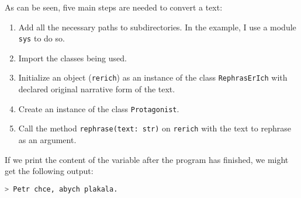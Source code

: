 As can be seen, five main steps are needed to convert a text:

\begin{enumerate}
	\item Add all the necessary paths to subdirectories. In the example, I use a module \texttt{sys} to do so.
	\item Import the classes being used.
	\item Initialize an object (\texttt{rerich}) as an instance of the class \texttt{RephrasErIch} with declared original narrative form of the text.
	\item Create an instance of the class \texttt{Protagonist}.
	\item Call the method \texttt{rephrase(text: str)} on \texttt{rerich} with the text to rephrase as an argument.
\end{enumerate}

If we print the content of the variable after the program has finished, we might get the following output:
\newline
\begin{lstlisting}[language=bash]
> Petr chce, abych plakala.
\end{lstlisting}

